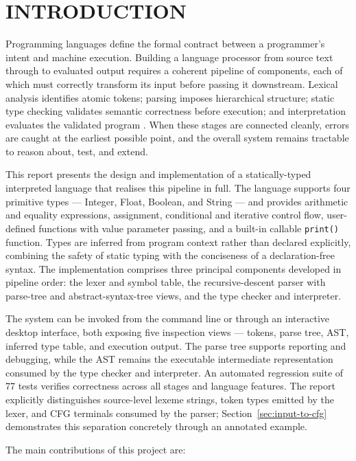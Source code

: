 \chapter{INTRODUCTION}

Programming languages define the formal contract between a programmer's intent
and machine execution. Building a language processor from source text through to
evaluated output requires a coherent pipeline of components, each of which must
correctly transform its input before passing it downstream. Lexical analysis
identifies atomic tokens; parsing imposes hierarchical structure; static type
checking validates semantic correctness before execution; and interpretation
evaluates the validated program \citep{aho2006compilers,nystrom2021crafting}. When these stages are connected cleanly, errors
are caught at the earliest possible point, and the overall system remains
tractable to reason about, test, and extend.

This report presents the design and implementation of a statically-typed
interpreted language that realises this pipeline in full. The language supports
four primitive types --- Integer, Float, Boolean, and String --- and provides
arithmetic and equality expressions, assignment, conditional and iterative
control flow, user-defined functions with value parameter passing, and a
built-in callable \texttt{print()} function. Types are inferred from program context
rather than declared explicitly, combining the safety of static typing with the
conciseness of a declaration-free syntax. The implementation comprises three
principal components developed in pipeline order: the lexer and symbol table,
the recursive-descent parser with parse-tree and abstract-syntax-tree views,
and the type checker and interpreter.

The system can be invoked from the command line or through an interactive
desktop interface, both exposing five inspection views --- tokens, parse tree,
AST, inferred type table, and execution output. The parse tree supports
reporting and debugging, while the AST remains the executable intermediate
representation consumed by the type checker and interpreter. An automated
regression suite of 77 tests verifies correctness across all
stages and language features.
The report explicitly distinguishes source-level lexeme strings, token types
emitted by the lexer, and CFG terminals consumed by the parser;
Section~\ref{sec:input-to-cfg} demonstrates this separation concretely through an annotated
example.

The main contributions of this project are:

